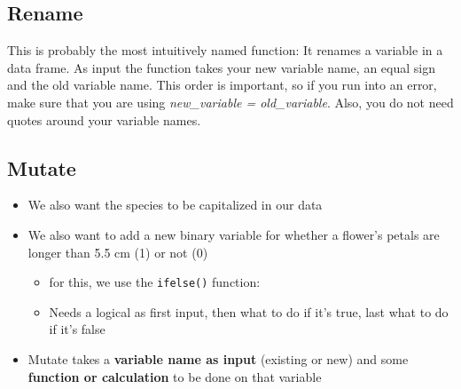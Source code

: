 \documentclass[
]{book}
\newenvironment{Shaded}{\begin{snugshade}}{\end{snugshade}}
\newcommand{\AttributeTok}[1]{\textcolor[rgb]{0.13,0.29,0.53}{#1}}
\newcommand{\CommentTok}[1]{\textcolor[rgb]{0.56,0.35,0.01}{\textit{#1}}}
\newcommand{\DecValTok}[1]{\textcolor[rgb]{0.00,0.00,0.81}{#1}}
\newcommand{\FloatTok}[1]{\textcolor[rgb]{0.00,0.00,0.81}{#1}}
\newcommand{\FunctionTok}[1]{\textcolor[rgb]{0.13,0.29,0.53}{\textbf{#1}}}
\newcommand{\NormalTok}[1]{#1}
\newcommand{\OtherTok}[1]{\textcolor[rgb]{0.56,0.35,0.01}{#1}}
\newcommand{\SpecialCharTok}[1]{\textcolor[rgb]{0.81,0.36,0.00}{\textbf{#1}}}
\providecommand{\tightlist}{%
  \setlength{\itemsep}{0pt}\setlength{\parskip}{0pt}}
\begin{document}
\subsection{Rename}\label{rename}

This is probably the most intuitively named function: It renames a variable in a data frame.
As input the function takes your new variable name, an equal sign and the old variable name.
This order is important, so if you run into an error, make sure that you are using \emph{new\_variable = old\_variable}.
Also, you do not need quotes around your variable names.

\subsection{Mutate}\label{mutate}

\begin{itemize}
\tightlist
\item
  We also want the species to be capitalized in our data
\item
  We also want to add a new binary variable for whether a flower's petals are longer than 5.5 cm (1) or not (0)

  \begin{itemize}
  \tightlist
  \item
    for this, we use the \texttt{ifelse()} function:
  \item
    Needs a logical as first input, then what to do if it's true, last what to do if it's false
  \end{itemize}
\item
  Mutate takes a \textbf{variable name as input} (existing or new) and some \textbf{function or calculation} to be done on that variable
\end{itemize}

\begin{Shaded}
\end{Shaded}
\end{document}
